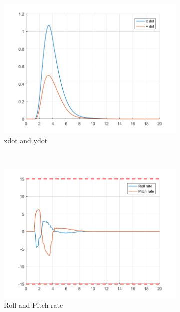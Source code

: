 \documentclass[11pt]{article}
\begin{document}
\begin{enumerate}
\begin{figure}[ht]
        \begin{subfigure}[c]{0.3\linewidth}
            \centering
            \includegraphics[width=\linewidth]{Plots_07_NonlinearModel_ReferenceTracking/07}
            \caption{xdot and ydot}
        \end{subfigure}
        ~
        \begin{subfigure}[c]{0.3\linewidth}
            \centering
            \includegraphics[width=\linewidth]{Plots_07_NonlinearModel_ReferenceTracking/08}
            \caption{Roll and Pitch rate}
        \end{subfigure}
        ~
        \begin{subfigure}[c]{0.3\linewidth}
            \centering

\end{subfigure}
\end{figure}
\end{enumerate}
\end{document}

